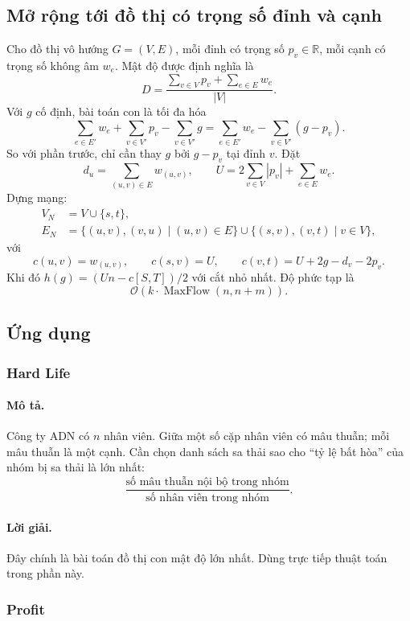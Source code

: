 \documentclass[11pt]{article}
\newcommand{\Oh}{\mathcal{O}}
\newcommand{\R}{\mathbb{R}}
\begin{document}
\subsection{Mở rộng tới đồ thị có trọng số đỉnh và cạnh}

Cho đồ thị vô hướng \(G=(V,E)\), mỗi đỉnh có trọng số \(p_v\in\R\), mỗi cạnh
có trọng số không âm \(w_e\). Mật độ được định nghĩa là
\[
  D=\frac{\sum_{v\in V}p_v+\sum_{e\in E}w_e}{|V|}.
\]
Với \(g\) cố định, bài toán con là tối đa hóa
\[
  \sum_{e\in E'}w_e+\sum_{v\in V'}p_v-\sum_{v\in V'}g
  =\sum_{e\in E'}w_e-\sum_{v\in V'}(g-p_v). \tag{4.3}
\]
So với phần trước, chỉ cần thay \(g\) bởi \(g-p_v\) tại đỉnh \(v\). Đặt
\[
  d_u=\sum_{(u,v)\in E} w_{(u,v)},\qquad
  U=2\sum_{v\in V}|p_v|+\sum_{e\in E}w_e.
\]
Dựng mạng:
\[
\begin{aligned}
V_N&=V\cup\{s,t\},\\
E_N&=\{(u,v),(v,u)\mid (u,v)\in E\}
\cup\{(s,v),(v,t)\mid v\in V\},
\end{aligned}
\]
với
\[
  c(u,v)=w_{(u,v)},\qquad
  c(s,v)=U,\qquad
  c(v,t)=U+2g-d_v-2p_v.
\]
Khi đó \(h(g)=(Un-c[S,T])/2\) với cắt nhỏ nhất. Độ phức tạp là
\[
  \Oh(k\cdot \operatorname{MaxFlow}(n,n+m)).
\]

\subsection{Ứng dụng}

\subsubsection{Hard Life}

\paragraph{Mô tả.}
Công ty ADN có \(n\) nhân viên. Giữa một số cặp nhân viên có mâu thuẫn; mỗi
mâu thuẫn là một cạnh. Cần chọn danh sách sa thải sao cho ``tỷ lệ bất hòa''
của nhóm bị sa thải là lớn nhất:
\[
  \frac{\text{số mâu thuẫn nội bộ trong nhóm}}{\text{số nhân viên trong nhóm}}.
\]

\paragraph{Lời giải.}
Đây chính là bài toán đồ thị con mật độ lớn nhất. Dùng trực tiếp thuật toán
trong phần này.

\subsubsection{Profit}
\end{document}
